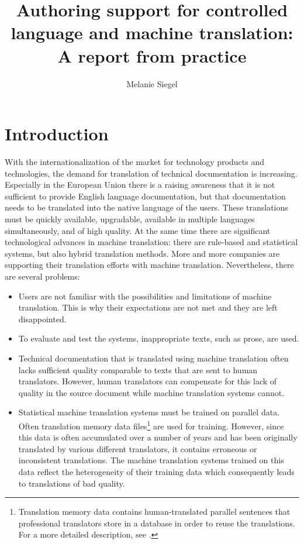 \documentclass[output=paper]{LSP/langsci}
\author{Melanie Siegel\affiliation{Hochschule Darmstadt}}
\title{Authoring support for controlled language and machine translation: A report from practice}
\begin{document}

\section{Introduction}\label{sec:siegel:1}

With the internationalization of the market for technology products and technologies, the demand for translation of technical documentation is increasing. Especially in the European Union there is a raising awareness that it is not sufficient to provide English language documentation, but that documentation needs to be translated into the native language of the users. These translations must be quickly available, upgradable, available in multiple languages simultaneously, and of high quality. At the same time there are significant technological advances in machine translation: there are rule-based and statistical systems, but also hybrid translation methods. More and more companies are supporting their translation efforts with machine translation. Nevertheless, there are several problems:

\begin{itemize}
\item
Users are not familiar with the possibilities and limitations of machine translation. This is why their expectations are not met and they are left disappointed.
\item
To evaluate and test the systems, inappropriate texts, such as prose, are used.
\item
Technical documentation that is translated using machine translation often lacks sufficient quality comparable to texts that are sent to human translators. However, human translators can compensate for this lack of quality in the source document while machine translation systems cannot.
\item
Statistical machine translation systems must be trained on parallel data. Often translation memory data files\footnote{ Translation memory data contains human-translated parallel sentences that professional translators store in a database in order to reuse the translations. For a more detailed description, see .} are used for training. However, since this data is often accumulated over a number of years and has been originally translated by various different translators, it contains erroneous or inconsistent translations. The machine translation systems trained on this data reflect the heterogeneity of their training data which consequently leads to translations of bad quality.
\end{itemize}
\end{document}
